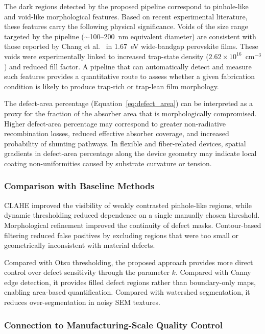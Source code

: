 \documentclass[pdflatex,sn-mathphys-num,iicol]{sn-jnl}
\theoremstyle{thmstyleone}
\theoremstyle{thmstyletwo}
\theoremstyle{thmstylethree}
\begin{document}
The dark regions detected by the proposed pipeline correspond to
pinhole-like and void-like morphological features. Based on recent
experimental literature, these features carry the following physical
significance. Voids of the size range targeted by the pipeline
($\sim$100--200~nm equivalent diameter) are consistent with those
reported by Chang et al.\ \cite{chang2026} in 1.67~eV wide-bandgap
perovskite films. These voids were experimentally linked to increased
trap-state density ($2.62 \times 10^{16}$~cm$^{-3}$) and reduced fill
factor. A pipeline that can automatically detect and measure such
features provides a quantitative route to assess whether a given
fabrication condition is likely to produce trap-rich or trap-lean
film morphology.

The defect-area percentage (Equation~\ref{eq:defect_area}) can be
interpreted as a proxy for the fraction of the absorber area that is
morphologically compromised. Higher defect-area percentage may
correspond to greater non-radiative recombination losses, reduced
effective absorber coverage, and increased probability of shunting
pathways. In flexible and fiber-related devices, spatial gradients in
defect-area percentage along the device geometry may indicate local
coating non-uniformities caused by substrate curvature or tension.

\subsubsection{Comparison with Baseline Methods}

CLAHE improved the visibility of weakly contrasted pinhole-like
regions, while dynamic thresholding reduced dependence on a single
manually chosen threshold. Morphological refinement improved the
continuity of defect masks. Contour-based filtering reduced false
positives by excluding regions that were too small or geometrically
inconsistent with material defects.

Compared with Otsu thresholding, the proposed approach provides more
direct control over defect sensitivity through the parameter $k$.
Compared with Canny edge detection, it provides filled defect regions
rather than boundary-only maps, enabling area-based quantification.
Compared with watershed segmentation, it reduces over-segmentation
in noisy SEM textures.

\subsubsection{Connection to Manufacturing-Scale Quality Control}
\end{document}
